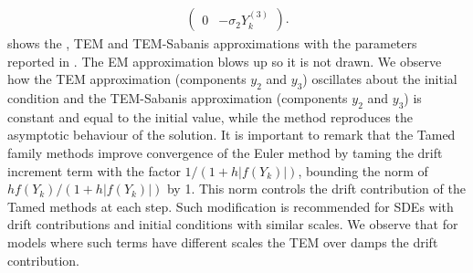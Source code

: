 \begin{example}
\begin{align}
\begin{pmatrix}
		0	&-\sigma_2 Y_k^{(3)}
	\end{pmatrix}.
\end{align}
%
	 shows the  \SM, TEM and TEM-Sabanis approximations
	with the parameters reported in \cite{Dalal2008}.  The EM approximation
	blows up  so it is not drawn. We observe how the TEM approximation (components $y_2$ and $y_3$) oscillates about 
	the initial condition and the 
	TEM-Sabanis approximation (components $y_2$ and $y_3$) is constant and equal to the initial value, while the \SM 
	method reproduces the asymptotic behaviour of the solution. It is important to remark that the Tamed family methods	
	improve convergence of the Euler method by taming the drift increment term with 
	the factor	$1/(1 + h |f(Y_k)|)$, bounding the norm of  $h f(Y_k)/(1 + h |f(Y_k)|)$ by 1. This norm   
	controls the drift contribution of the Tamed methods  at each step. Such modification 
	is recommended for SDEs with drift contributions and initial conditions with similar scales. We observe
	that for models where such terms have different scales the TEM over damps the drift contribution. 
\end{example}

